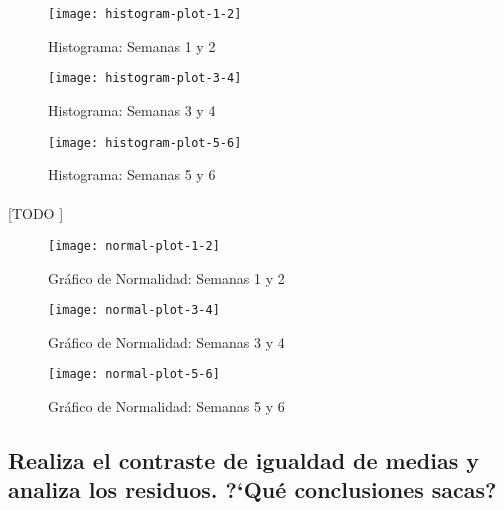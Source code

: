 \documentclass[11pt]{article}
\begin{document}
      \begin{figure}
        \centering
        \begin{minipage}{.49\textwidth}
          \centering
          \texttt{[image: histogram-plot-1-2]}
          \caption{Histograma: Semanas 1 y 2}
          \label{fig:histogram-plot-1-2}
        \end{minipage}
        \begin{minipage}{.49\textwidth}
          \centering
          \texttt{[image: histogram-plot-3-4]}
          \caption{Histograma: Semanas 3 y 4}
          \label{fig:histogram-plot-3-4}
        \end{minipage}
        \begin{minipage}{.49\textwidth}
          \centering
          \texttt{[image: histogram-plot-5-6]}
          \caption{Histograma: Semanas 5 y 6}
          \label{fig:histogram-plot-5-6}
        \end{minipage}
      \end{figure}

      \paragraph{}
      [TODO ]


      \begin{figure}
        \centering
        \begin{minipage}{.49\textwidth}
          \centering
          \texttt{[image: normal-plot-1-2]}
          \caption{Gráfico de Normalidad: Semanas 1 y 2}
          \label{fig:normal-plot-1-2}
        \end{minipage}
        \begin{minipage}{.49\textwidth}
          \centering
          \texttt{[image: normal-plot-3-4]}
          \caption{Gráfico de Normalidad: Semanas 3 y 4}
          \label{fig:normal-plot-3-4}
        \end{minipage}
        \begin{minipage}{.49\textwidth}
          \centering
          \texttt{[image: normal-plot-5-6]}
          \caption{Gráfico de Normalidad: Semanas 5 y 6}
          \label{fig:normal-plot-5-6}
        \end{minipage}
      \end{figure}

    \subsection{Realiza el contraste de igualdad de medias y analiza los residuos. ?`Qué conclusiones sacas?}
    \label{sec:e2}
\end{document}

